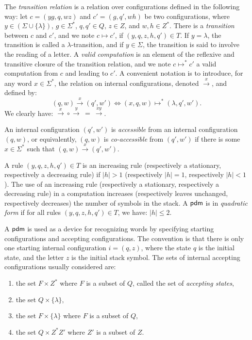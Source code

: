 The \emph{transition relation} is a relation over configurations defined in the following way: let $c = (yg, q, wz)$ and $c' = (g, q', wh)$ be two configurations, where $y \in (\Sigma \cup \{\lambda\})$, $g \in \Sigma^*$, $q, q' \in Q$, $z \in Z$, and $w, h \in Z^*$. There is a \emph{transition} between $c$ and $c'$, and we note $c \mapsto c'$, if $(y, q, z, h, q') \in T$. If $y = \lambda$, the transition is called a $\lambda$-transition, and if $y \in \Sigma$, the transition  is said to involve the reading of a letter. A \emph{valid computation} is an element of the reflexive and transitive closure of the transition relation, and we note $c \mapsto^* c'$ a valid computation from $c$ and leading to $c'$. A convenient notation is to introduce, for any word $x \in \Sigma^*$, the relation on internal configurations, denoted $\xrightarrow{x}$, and defined by:
$$(q, w) \xrightarrow{x} (q', w') \Leftrightarrow (x, q, w) \mapsto^* (\lambda, q', w').$$
We clearly have: $\xrightarrow{x} \circ \xrightarrow{y}\ =\ \xrightarrow{xy}$.

An internal configuration $(q', w')$ is \emph{accessible} from an internal configuration $(q, w)$, or equivalently, $(q, w)$ is \emph{co-accessible} from $(q', w')$ if there is some $x \in \Sigma^*$ such that $(q, w) \xrightarrow{x} (q', w')$.

A rule $(y, q, z, h, q') \in T$ is an increasing rule (respectively a stationary, respectively a decreasing rule) if $|h| > 1$ (respectively $|h| = 1$, respectively $|h| < 1$). The use of an increasing rule (respectively a stationary, respectively a decreasing rule) in a computation increases (respectively leaves unchanged, respectively decreases) the number of symbols in the stack. A $\textup{\sf pdm}$ is in \emph{quadratic form} if for all rules $(y, q, z, h, q') \in T$, we have: $|h| \le 2$.

A $\textup{\sf pdm}$ is used as a device for recognizing words by specifying starting configurations and accepting configurations. The convention is that there is only one starting internal configuration $i = (q, z)$, where the state $q$ is the initial state, and the letter $z$ is the initial stack symbol. The sets of internal accepting configurations usually considered are:

\begin{enumerate}
\item the set $F \times Z^*$ where $F$ is a subset of $Q$, called the set of \emph{accepting states},
\item the set $Q \times \{\lambda\}$,
\item the set $F \times \{\lambda\}$ where $F$ is a subset of $Q$,
\item the set $Q \times Z^* Z'$ where $Z'$ is a subset of $Z$.
\end{enumerate}

